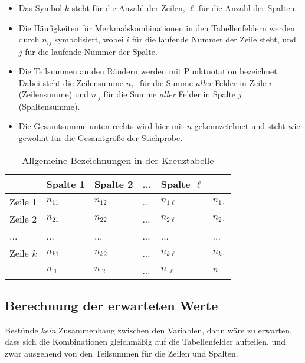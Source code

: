 \documentclass[
  ngerman,
]{article}
\providecommand{\tightlist}{%
  \setlength{\itemsep}{0pt}\setlength{\parskip}{0pt}}
\begin{document}
\begin{itemize}
\tightlist
\item
  Das Symbol \(k\) steht für die Anzahl der Zeilen, \(\ell\) für die Anzahl der Spalten.
\item
  Die Häufigkeiten für Merkmalskombinationen in den Tabellenfeldern werden durch \(n_{ij}\) symbolisiert, wobei \(i\) für die laufende Nummer der Zeile steht, und \(j\) für die laufende Nummer der Spalte.
\item
  Die Teilsummen an den Rändern werden mit Punktnotation bezeichnet. Dabei steht die Zeilensumme \(n_{i\cdot}\) für die Summe \emph{aller} Felder in Zeile \(i\) (Zeilensumme) und \(n_{\cdot j}\) für die Summe \emph{aller} Felder in Spalte \(j\) (Spaltensumme).
\item
  Die Gesamtsumme unten rechts wird hier mit \(n\) gekennzeichnet und steht wie gewohnt für die Gesamtgröße der Stichprobe.
\end{itemize}

\begin{table}

\caption{\label{tab:crossalg}Allgemeine Bezeichnungen in der Kreuztabelle}
\centering
\begin{tabular}[t]{>{}l|lll>{}l|l}
\toprule
  & Spalte 1 & Spalte 2 & ... & Spalte $\ell$ & \\
\midrule
Zeile 1 & $n_{11}$ & $n_{12}$ & ... & $n_{1\ell}$ & $n_{1\cdot}$\\
Zeile 2 & $n_{21}$ & $n_{22}$ & ... & $n_{2\ell}$ & $n_{2\cdot}$\\
... & ... & ... & ... & ... & ...\\
Zeile $k$ & $n_{k1}$ & $n_{k2}$ & ... & $n_{k\ell}$ & $n_{k\cdot}$\\
\midrule
 & $n_{\cdot1}$ & $n_{\cdot2}$ & ... & $n_{\cdot\ell}$ & $n$\\
\bottomrule
\end{tabular}
\end{table}

\hypertarget{berechnung-der-erwarteten-werte}{%
\subsection{Berechnung der erwarteten Werte}\label{berechnung-der-erwarteten-werte}}

Bestünde \emph{kein} Zusammenhang zwischen den Variablen, dann wäre zu erwarten, dass sich die Kombinationen gleichmäßig auf die Tabellenfelder aufteilen, und zwar ausgehend von den Teilsummen für die Zeilen und Spalten.
\end{document}
